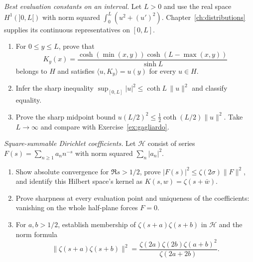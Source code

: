 \begin{exercise}[$\star\star$]\label{pb:sobolev}
\emph{Best evaluation constants on an interval.} Let $L>0$ and use the real space $H^1(]0,L[)$ with norm squared $\int_0^L(u^2+(u')^2)$. Chapter~\ref{ch:distributions} supplies its continuous representatives on $[0,L]$.
\begin{enumerate}[label=(\alph*)]
\item For $0\le y\le L$, prove that
\[K_y(x)=\frac{\cosh(\min(x,y))\cosh(L-\max(x,y))}{\sinh L}\]
belongs to $H$ and satisfies $\langle u,K_y\rangle=u(y)$ for every $u\in H$.
\item Infer the sharp inequality $\sup_{[0,L]}|u|^2\le\coth L\,\|u\|^2$ and classify equality.
\item Prove the sharp midpoint bound $u(L/2)^2\le\tfrac12\coth(L/2)\|u\|^2$. Take $L\to\infty$ and compare with Exercise~\ref{ex:gagliardo}.
\end{enumerate}
\end{exercise}
\begin{exercise}[$\star\star$]\label{pb:dirichlet}
\emph{Square-summable Dirichlet coefficients.} Let $\mathcal H$ consist of series $F(s)=\sum_{n\ge1}a_nn^{-s}$ with norm squared $\sum_n|a_n|^2$.
\begin{enumerate}[label=(\alph*)]
\item Show absolute convergence for $\Re s>1/2$, prove $|F(s)|^2\le\zeta(2\sigma)\|F\|^2$, and identify this Hilbert space's kernel as $K(s,w)=\zeta(s+\bar w)$.
\item Prove sharpness at every evaluation point and uniqueness of the coefficients: vanishing on the whole half-plane forces $F=0$.
\item For $a,b>1/2$, establish membership of $\zeta(s+a)\zeta(s+b)$ in $\mathcal H$ and the norm formula
\[\|\zeta(s+a)\zeta(s+b)\|^2=\frac{\zeta(2a)\zeta(2b)\zeta(a+b)^2}{\zeta(2a+2b)}.\]
\end{enumerate}
\end{exercise}

